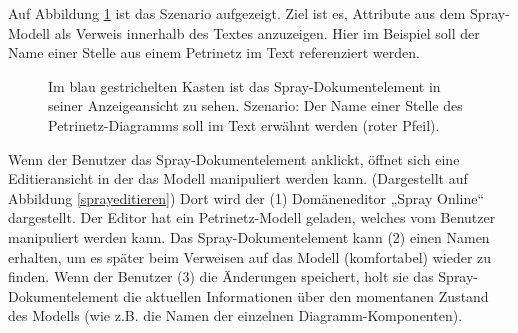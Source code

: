  
Auf Abbildung \ref{sprayanzeigen} ist das Szenario aufgezeigt. Ziel ist es, Attribute aus dem Spray-Modell als Verweis innerhalb des Textes anzuzeigen. Hier im Beispiel soll der Name einer Stelle aus einem Petrinetz im Text referenziert werden.

 
\begin{figure}[h!]
\centering
\advance\leftskip-2.5cm
\caption{ Im blau gestrichelten Kasten ist das Spray-Dokumentelement in seiner Anzeigeansicht zu sehen. Szenario: Der Name einer Stelle des Petrinetz-Diagramms soll im Text erwähnt werden (roter Pfeil). }\label{sprayanzeigen}
\end{figure}
 
Wenn der Benutzer das Spray-Dokumentelement anklickt, öffnet sich eine Editieransicht in der das Modell manipuliert werden kann. (Dargestellt auf Abbildung \ref{sprayeditieren}) Dort wird der (1) Domäneneditor „Spray Online“ dargestellt. Der Editor hat ein Petrinetz-Modell geladen, welches vom Benutzer manipuliert werden kann. Das Spray-Dokumentelement kann (2) einen Namen erhalten, um es später beim Verweisen auf das Modell (komfortabel) wieder zu finden. Wenn der Benutzer (3) die Änderungen speichert, holt sie das Spray-Dokumentelement die aktuellen Informationen über den momentanen Zustand des Modells (wie z.B. die Namen der einzelnen Diagramm-Komponenten).

